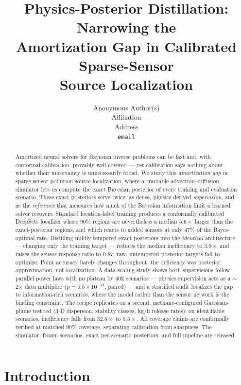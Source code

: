 \documentclass{article}
\title{Physics-Posterior Distillation: Narrowing the\\
Amortization Gap in Calibrated Sparse-Sensor\\
Source Localization}
\author{%
  Anonymous Author(s)\\
  Affiliation\\
  Address\\
  \texttt{email}
}
\begin{document}
\maketitle

\begin{abstract}
Amortized neural solvers for Bayesian inverse problems can be fast and, with conformal
calibration, provably well-covered --- yet calibration says nothing about whether their
uncertainty is unnecessarily broad. We study this \emph{amortization gap} in sparse-sensor
pollution-source localization, where a tractable advection--diffusion simulator lets us
compute the exact Bayesian posterior of every training and evaluation scenario. These
exact posteriors serve twice: as dense, physics-derived \emph{supervision}, and as the
\emph{reference} that measures how much of the Bayesian information limit a learned solver
recovers. Standard location-label training produces a conformally calibrated DeepSets
localizer whose $90\%$ regions are nevertheless a median $5.6\times$ larger than the
exact-posterior regions, and which reacts to added sensors at only $47\%$ of the
Bayes-optimal rate. Distilling mildly tempered exact posteriors into the \emph{identical}
architecture --- changing only the training target --- reduces the median inefficiency to
$3.9\times$ and raises the sensor-response ratio to $0.87$; raw, untempered posterior
targets fail to optimize. Point accuracy barely changes
throughout: the deficiency was posterior approximation, not localization. A data-scaling
study shows both supervisions follow parallel power laws with no plateau by 40k
scenarios --- physics supervision acts as a $\sim$2$\times$ data multiplier
($p = 5.5\times10^{-13}$, paired) --- and a stratified audit localizes the gap to
information-rich scenarios, where the model rather than the sensor network is the
binding constraint. The recipe replicates on a second, methane-configured
Gaussian-plume testbed (3-D dispersion, stability classes, kg/h release rates): on
identifiable scenarios, inefficiency falls from $32.5\times$ to $8.5\times$. All coverage
claims are conformally verified at matched $90\%$ coverage, separating calibration from
sharpness. The simulator, frozen scenarios, exact per-scenario posteriors, and full
pipeline are released.
\end{abstract}

\section{Introduction}
\end{document}
